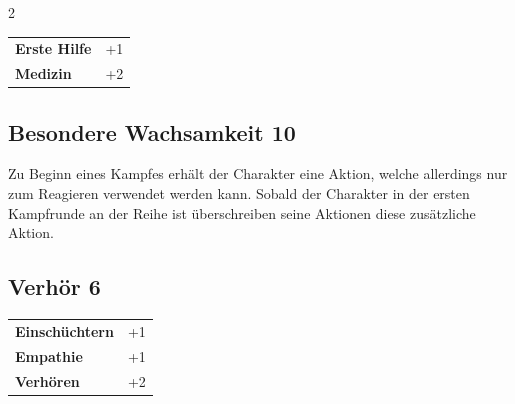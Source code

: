\begin{multicols}{2}
\begin{tcolorbox}
\begin{tabular}{@{}ll@{}}
    \textbf{Erste Hilfe} & +1\\
    \textbf{Medizin} & +2\\
\end{tabular}


\end{tcolorbox}

\begin{tcolorbox}
    \subsection*{Besondere Wachsamkeit \hfill \small{10 }}
    \tcblower
Zu Beginn eines Kampfes erhält der Charakter eine Aktion, welche allerdings nur zum Reagieren verwendet werden kann. Sobald der Charakter in der ersten Kampfrunde an der Reihe ist überschreiben seine Aktionen diese zusätzliche Aktion.


\vspace{3mm}



\end{tcolorbox}

\begin{tcolorbox}
    \subsection*{Verhör \hfill \small{6 }}
    \tcblower




\begin{tabular}{@{}ll@{}}
    \textbf{Einschüchtern} & +1\\
    \textbf{Empathie} & +1\\
    \textbf{Verhören} & +2\\
\end{tabular}


\end{tcolorbox}

\begin{tcolorbox}

\end{tcolorbox}
\end{multicols}
